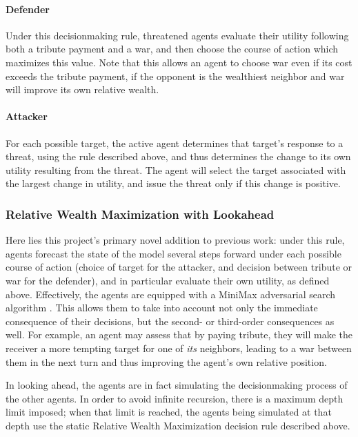 \documentclass{article}
\begin{document}
\paragraph{Defender}
Under this decisionmaking rule, threatened agents evaluate their utility following both a tribute payment and a war, and then choose the course of action which maximizes this value. Note that this allows an agent to choose war even if its cost exceeds the tribute payment, if the opponent is the wealthiest neighbor and war will improve its own relative wealth.

\paragraph{Attacker}
For each possible target, the active agent determines that target's response to a threat, using the rule described above, and thus determines the change to its own utility resulting from the threat. The agent will select the target associated with the largest change in utility, and issue the threat only if this change is positive.

\subsubsection{Relative Wealth Maximization with Lookahead}

Here lies this project's primary novel addition to previous work: under this rule, agents forecast the state of the model several steps forward under each possible course of action (choice of target for the attacker, and decision between tribute or war for the defender), and in particular evaluate their own utility, as defined above. Effectively, the agents are equipped with a MiniMax adversarial search algorithm \citep{russell_2009}. This allows them to take into account not only the immediate consequence of their decisions, but the second- or third-order consequences as well. For example, an agent may assess that by paying tribute, they will make the receiver a more tempting target for one of \emph{its} neighbors, leading to a war between them in the next turn and thus improving the agent's own relative position.

In looking ahead, the agents are in fact simulating the decisionmaking process of the other agents. In order to avoid infinite recursion, there is a maximum depth limit imposed; when that limit is reached, the agents being simulated at that depth use the static Relative Wealth Maximization decision rule described above. 
\end{document}
